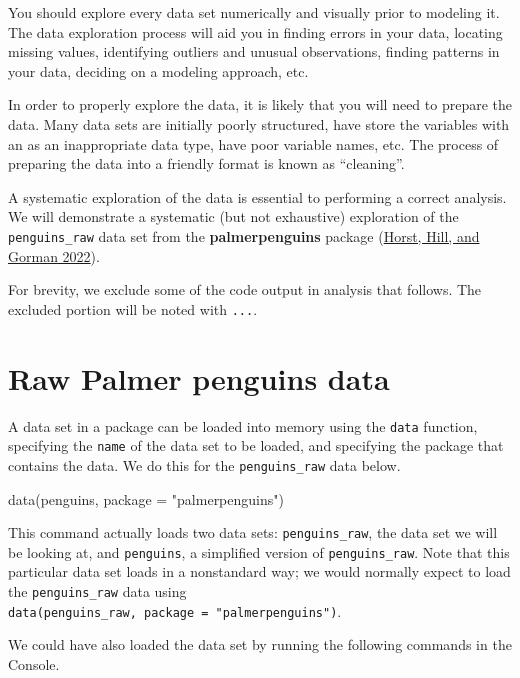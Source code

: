 \documentclass[
]{book}
\newenvironment{Shaded}{\begin{snugshade}}{\end{snugshade}}
\newcommand{\AttributeTok}[1]{\textcolor[rgb]{0.77,0.63,0.00}{#1}}
\newcommand{\FunctionTok}[1]{\textcolor[rgb]{0.00,0.00,0.00}{#1}}
\newcommand{\NormalTok}[1]{#1}
\newcommand{\StringTok}[1]{\textcolor[rgb]{0.31,0.60,0.02}{#1}}
\theoremstyle{definition}
\theoremstyle{definition}
\theoremstyle{definition}
\theoremstyle{definition}
\theoremstyle{remark}
\begin{document}
You should explore every data set numerically and visually prior to modeling it. The data exploration process will aid you in finding errors in your data, locating missing values, identifying outliers and unusual observations, finding patterns in your data, deciding on a modeling approach, etc.

In order to properly explore the data, it is likely that you will need to prepare the data. Many data sets are initially poorly structured, have store the variables with an as an inappropriate data type, have poor variable names, etc. The process of preparing the data into a friendly format is known as ``cleaning''.

A systematic exploration of the data is essential to performing a correct analysis. We will demonstrate a systematic (but not exhaustive) exploration of the \texttt{penguins\_raw} data set from the \textbf{palmerpenguins} package (\protect\hyperlink{ref-R-palmerpenguins}{Horst, Hill, and Gorman 2022}).

For brevity, we exclude some of the code output in analysis that follows. The excluded portion will be noted with \texttt{...}.

\hypertarget{raw-palmer-penguins-data}{%
\section{Raw Palmer penguins data}\label{raw-palmer-penguins-data}}

A data set in a package can be loaded into memory using the \texttt{data} function, specifying the \texttt{name} of the data set to be loaded, and specifying the package that contains the data. We do this for the \texttt{penguins\_raw} data below.

\begin{Shaded}
\begin{Highlighting}[]
\FunctionTok{data}\NormalTok{(penguins, }\AttributeTok{package =} \StringTok{"palmerpenguins"}\NormalTok{)}
\end{Highlighting}
\end{Shaded}

This command actually loads two data sets: \texttt{penguins\_raw}, the data set we will be looking at, and \texttt{penguins}, a simplified version of \texttt{penguins\_raw}. Note that this particular data set loads in a nonstandard way; we would normally expect to load the \texttt{penguins\_raw} data using \texttt{data(penguins\_raw,\ package\ =\ "palmerpenguins")}.

We could have also loaded the data set by running the following commands in the Console.
\end{document}
